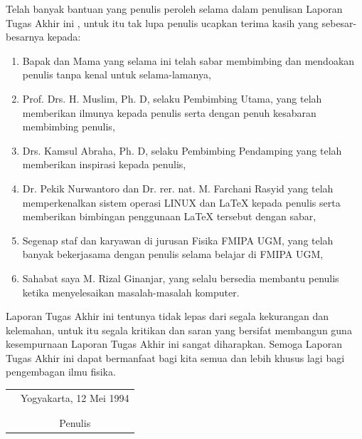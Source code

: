 \documentclass[laporan]{ugmlaporanta}
\begin{document}
Telah banyak bantuan yang penulis peroleh selama dalam penulisan Laporan Tugas Akhir ini
, untuk itu tak lupa penulis ucapkan terima kasih yang sebesar-besarnya
kepada:
\begin{enumerate}
\item{Bapak dan Mama yang selama ini telah sabar membimbing dan mendoakan
penulis tanpa kenal untuk selama-lamanya,}
\item{Prof. Drs. H. Muslim, Ph. D, selaku Pembimbing Utama, yang telah
memberikan ilmunya kepada penulis serta dengan penuh kesabaran membimbing penulis,}
\item{Drs. Kamsul Abraha, Ph. D, selaku Pembimbing Pendamping yang telah
memberikan inspirasi kepada penulis,} 
\item{Dr. Pekik Nurwantoro dan Dr. rer. nat. M. Farchani Rasyid
yang telah memperkenalkan sistem operasi LINUX dan \LaTeX{} kepada penulis serta
memberikan bimbingan penggunaan \LaTeX{} tersebut dengan sabar,} 
\item{Segenap staf dan karyawan di jurusan Fisika FMIPA UGM, yang telah
banyak bekerjasama dengan penulis selama belajar di FMIPA UGM,} 
\item{Sahabat saya M. Rizal Ginanjar, yang selalu bersedia membantu penulis ketika
menyelesaikan masalah-masalah komputer.} 
\end{enumerate}

Laporan Tugas Akhir ini tentunya tidak lepas dari segala kekurangan dan kelemahan, untuk itu
segala kritikan dan saran yang bersifat membangun guna kesempurnaan Laporan Tugas Akhir ini
sangat diharapkan. Semoga Laporan Tugas Akhir ini dapat bermanfaat bagi kita semua dan lebih
khusus lagi bagi pengembagan ilmu fisika.

\begin{tabular}{p{7.5cm}c}
&Yogyakarta, 12 Mei 1994\\
&\\
&\\
&Penulis
\end{tabular}

\tableofcontents
\listoftables
\listoffigures
\end{document}

